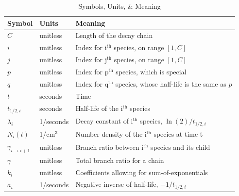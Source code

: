 \documentclass[letterpaper]{physor2018}
\newcommand{\ith}{i$^{\mathrm{th}}$\xspace}
\newcommand{\jth}{j$^{\mathrm{th}}$\xspace}
\newcommand{\pth}{p$^{\mathrm{th}}$\xspace}
\newcommand{\qth}{q$^{\mathrm{th}}$\xspace}
\begin{document}
\begin{table}[!htb]
\centering
\caption{Symbols, Units, \& Meaning}
\label{nomenclature}
\begin{tabular}{|l|l|l|}
\hline
\textbf{Symbol} & \textbf{Units} & \textbf{Meaning} \\
\hline
$C$                  & unitless  & Length of the decay chain \\
$i$                  & unitless  & Index for \ith species, on range $[1, C]$ \\
$j$                  & unitless  & Index for \jth species, on range $[1, C]$ \\
$p$                  & unitless  & Index for \pth species, which is special \\
$q$                  & unitless  & Index for \qth species, whose half-life is the same as $p$ \\
$t$                  & seconds   & Time \\
$t_{1/2,i}$          & seconds   & Half-life of the \ith species \\
$\lambda_i$          & 1/seconds & Decay constant of \ith species, $\ln(2)/t_{1/2,i}$ \\
$N_i(t)$             & 1/cm$^3$  & Number density of the \ith species at time t \\
$\gamma_{i \to i+1}$ & unitless  & Branch ratio between \ith species and its child \\
$\gamma$             & unitless  & Total branch ratio for a chain \\
$k_i$                & unitless  & Coefficients allowing for sum-of-exponentials \\
$a_i$                & 1/seconds & Negative inverse of half-life, $-1/t_{1/2,i}$ \\
\hline
\end{tabular}
\end{table}

\setlength{\baselineskip}{12pt}


\end{document}
